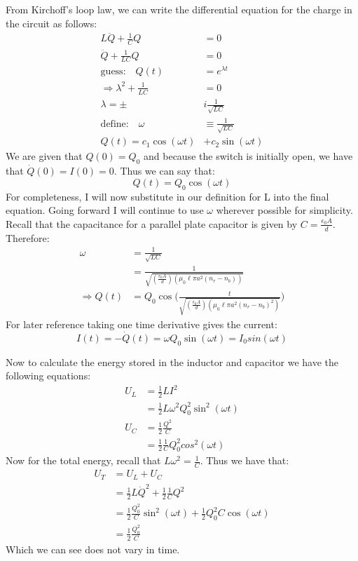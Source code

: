 \documentclass[a4paper, 11pt]{article}
\begin{document}
\noindent From Kirchoff's loop law, we can write the differential equation for the charge in the circuit as follows: 
	\begin{align*}
		L\ddot{Q} + \frac{1}{C}Q &= 0 \\
		\ddot{Q} + \frac{1}{LC}Q &= 0 \\ 
		\text{guess:} \quad Q(t) &= e^{\lambda t}  \\ 
		\Rightarrow \lambda^2 +\frac{1}{LC} &= 0 \\ 
		\lambda = \pm &i\frac{1}{\sqrt{LC}} \\ 
		\text{define:} \quad \omega &\equiv \frac{1}{\sqrt{LC}} \\ 
		Q(t) = c_1 \cos(\omega t) &+ c_2 \sin(\omega t)
	\end{align*}
We are given that $Q(0) = Q_0$ and because the switch is initially open, we have that $\dot{Q}(0)=I(0)=0$. Thus we can say that: 
	\begin{equation*}
		Q(t) = Q_0 \cos(\omega t)
	\end{equation*}
For completeness, I will now substitute in our definition for L into the final equation. Going forward I will continue to use $\omega$ wherever possible for simplicity. Recall that the capacitance for a parallel plate capacitor is given by $C=\frac{\epsilon_0 A}{d}$. Therefore: 	
	\begin{align*}
		\omega 	&= \frac{1}{\sqrt{LC}} \\ 
				&= \frac{1}{\sqrt{(\frac{\epsilon_0 A}{d})(\mu_0 \ell \pi a^2 (n_r - n_b))}}	 \\ 
		\Rightarrow Q(t) &= Q_0 \cos\Bigg(\frac{t}{\sqrt{(\frac{\epsilon_0 A}{d})(\mu_0 \ell \pi a^2 (n_r - n_b)^2)}}\Bigg)
	\end{align*}
For later reference taking one time derivative gives the current: 
	\begin{equation*}
		I(t) = -\dot{Q}(t) = \omega Q_0 \sin(\omega t) = I_0sin(\omega t)
	\end{equation*}

Now to calculate the energy stored in the inductor and capacitor we have the following equations: 
	\begin{align*}
		U_L &= \frac{1}{2}LI^2 \\ 
			&= \frac{1}{2}L\omega^2 Q_0^2\sin^2(\omega t) \\ 
		U_C &= \frac{1}{2}\frac{Q^2}{C} \\ 
			&= \frac{1}{2}\frac{1}{C}Q_0^2cos^2(\omega t)
	\end{align*}
Now for the total energy, recall that $L\omega^2 = \frac{1}{C}$. Thus we have that: 
	\begin{align*}
		U_T &= U_L + U_C \\ 	
			&= \frac{1}{2}L\dot{Q}^2 + \frac{1}{2}\frac{1}{C}Q^2 \\ 
			&= \frac{1}{2}\frac{Q_0^2}{C}\sin^2(\omega t) + \frac{1}{2}{Q_0^2}{C}\cos(\omega t) \\ 
			&= \frac{1}{2}\frac{Q_0^2}{C}
	\end{align*}
Which we can see does not vary in time. \\ 
\end{document}
